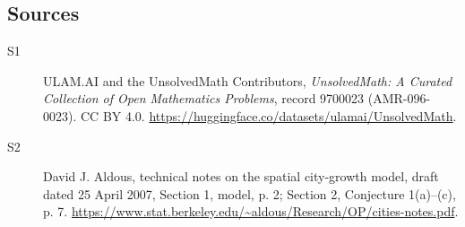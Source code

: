 \documentclass[11pt]{article}
\begin{document}
\subsection{Sources}
\begin{description}
\item[\hypertarget{source:9700023:1}{S1}] ULAM.AI and the UnsolvedMath Contributors, \emph{UnsolvedMath: A Curated Collection of Open Mathematics Problems}, record 9700023 (AMR-096-0023). CC BY 4.0. \url{https://huggingface.co/datasets/ulamai/UnsolvedMath}.
\item[\hypertarget{source:9700023:2}{S2}] David J. Aldous, technical notes on the spatial city-growth model, draft dated 25 April 2007, Section 1, model, p. 2; Section 2, Conjecture 1(a)--(c), p. 7. \url{https://www.stat.berkeley.edu/~aldous/Research/OP/cities-notes.pdf}.
\end{description}
\label{end:9700023}
\end{document}
